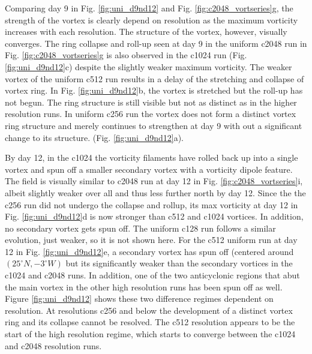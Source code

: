 Comparing day 9 in Fig. \ref{fig:uni_d9nd12} and Fig. \ref{fig:c2048_vortseries}g,
the strength of the vortex is clearly depend on resolution as the maximum vorticity
increases with each resolution. The structure of the vortex, however, visually 
converges. The ring collapse and roll-up seen at day 9 in the 
uniform c2048 run in Fig. \ref{fig:c2048_vortseries}g
is also observed in the c1024 run (Fig. \ref{fig:uni_d9nd12}c) 
despite the slightly weaker maximum vorticity.
The weaker vortex of the uniform c512 run results in a delay of the 
stretching and collapse of vortex ring. In Fig. \ref{fig:uni_d9nd12}b,
the vortex is stretched but the roll-up has not begun. The ring
structure is still visible but not as distinct as in the higher resolution runs.
In uniform c256 run the vortex does not form a distinct vortex ring structure 
and merely continues to strengthen at day 9 with out a significant
change to its structure. (Fig. \ref{fig:uni_d9nd12}a).

By day 12, in the c1024 the vorticity filaments have rolled back up into a single vortex and spun off
a smaller secondary vortex with a vorticity dipole feature. The field is visually
similar to c2048 run at day 12 in Fig. \ref{fig:c2048_vortseries}i, 
albeit slightly weaker over all and thus less further north by day 12. 
Since the the c256 run did not undergo the collapse and rollup,
its max vorticity at day 12 in Fig. \ref{fig:uni_d9nd12}d is now stronger 
than c512 and c1024 vortices.  In addition, no secondary vortex gets 
spun off.  The uniform c128 run follows a similar evolution, just weaker, so it is not shown here. 
For the c512 uniform run at day 12 in Fig. \ref{fig:uni_d9nd12}e, a secondary vortex has spun off 
(centered around $(25^\circ N, -3^\circ W)$ but its significantly weaker than the secondary vortices 
in the c1024 and c2048 runs. In addition, one of the two anticyclonic regions that abut the main 
vortex in the other high resolution runs has been spun off as well. Figure \ref{fig:uni_d9nd12}
shows these two difference regimes dependent on resolution. At resolutions c256 and below
the development of a distinct vortex ring and its collapse cannot be resolved. The c512
resolution appears to be the start of the high resolution regime, 
which starts to converge between the c1024 and c2048 resolution runs.

